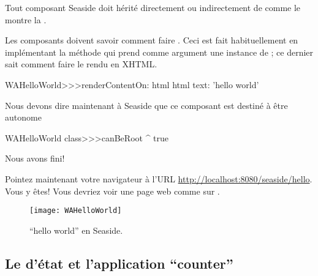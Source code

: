 \documentclass[a4paper,10pt,twoside]{book}
\begin{document}
Tout composant Seaside doit hérité directement ou indirectement de
 comme le montre la .


Les composants doivent savoir comment faire .
Ceci est fait habituellement en implémentant la méthode
 qui prend comme argument une
instance de  ; ce dernier sait comment faire le
rendu en XHTML.

\begin{code}{}
WAHelloWorld>>>renderContentOn: html
	html text: 'hello world'
\end{code}

\noindent
Nous devons dire maintenant à Seaside que ce composant est destiné à
être autonome


\begin{code}{}
WAHelloWorld class>>>canBeRoot
	^ true
\end{code}

\noindent
Nous avons fini!

Pointez maintenant votre navigateur 
à l'URL \url{http://localhost:8080/seaside/hello}.
Vous y êtes! Vous devriez voir une page web comme sur
 .

\begin{figure}[htb]
\begin{center}
\texttt{[image: WAHelloWorld]}
\caption{``hello world'' en Seaside.}
\end{center}
\end{figure}

\subsection{Le \backtracking d'état et l'application ``counter''}
\end{document}
